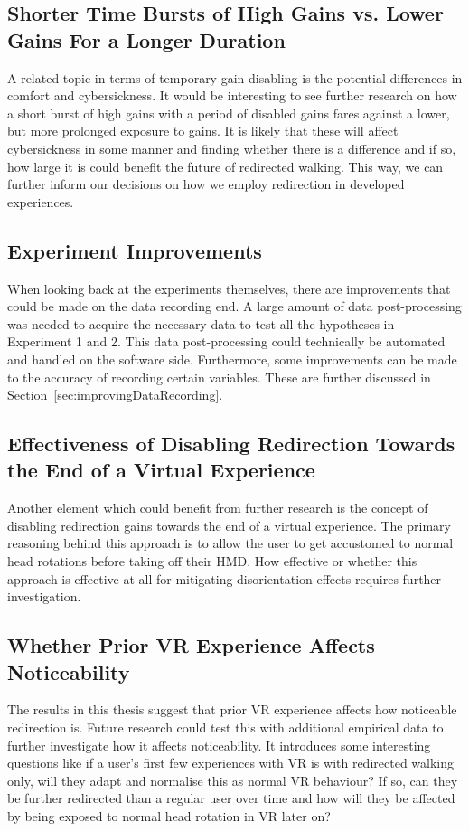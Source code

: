 \subsection{Shorter Time Bursts of High Gains vs. Lower Gains For a Longer Duration}
A related topic in terms of temporary gain disabling is the potential differences in comfort and cybersickness. It would be interesting to see further research on how a short burst of high gains with a period of disabled gains fares against a lower, but more prolonged exposure to gains. It is likely that these will affect cybersickness in some manner and finding whether there is a difference and if so, how large it is could benefit the future of redirected walking. This way, we can further inform our decisions on how we employ redirection in developed experiences.

\subsection{Experiment Improvements}
When looking back at the experiments themselves, there are improvements that could be made on the data recording end. A large amount of data post-processing was needed to acquire the necessary data to test all the hypotheses in Experiment 1 and 2. This data post-processing could technically be automated and handled on the software side. Furthermore, some improvements can be made to the accuracy of recording certain variables. These are further discussed in Section~\ref{sec:improvingDataRecording}. 

\subsection{Effectiveness of Disabling Redirection Towards the End of a Virtual Experience}
Another element which could benefit from further research is the concept of disabling redirection gains towards the end of a virtual experience. The primary reasoning behind this approach is to allow the user to get accustomed to normal head rotations before taking off their HMD. How effective or whether this approach is effective at all for mitigating disorientation effects requires further investigation.
  
\subsection{Whether Prior VR Experience Affects Noticeability}
The results in this thesis suggest that prior VR experience affects how noticeable redirection is. Future research could test this with additional empirical data to further investigate how it affects noticeability. It introduces some interesting questions like if a user's first few experiences with VR is with redirected walking only, will they adapt and normalise this as normal VR behaviour? If so, can they be further redirected than a regular user over time and how will they be affected by being exposed to normal head rotation in VR later on?


